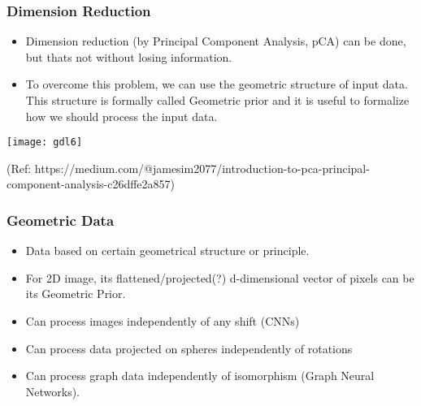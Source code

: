 \begin{frame}[fragile]\frametitle{Dimension Reduction}

\begin{itemize}
\item Dimension reduction (by Principal Component Analysis, pCA) can be done, but thats not without losing information.
\item To overcome this problem, we can use the geometric structure of input data. This structure is formally called Geometric prior and it is useful to formalize how we should process the input data.
\end{itemize}
	  
\begin{center}
\texttt{[image: gdl6]}
\end{center}

{\tiny (Ref: https://medium.com/@jamesim2077/introduction-to-pca-principal-component-analysis-c26dffe2a857)}		
\end{frame}




\begin{frame}[fragile]\frametitle{Geometric Data}

\begin{itemize}
\item Data based on certain geometrical structure or principle. 
\item For 2D image, its flattened/projected(?) d-dimensional vector of pixels can be its Geometric Prior.
\item Can process images independently of any shift (CNNs)
\item Can process data projected on spheres independently of rotations
\item Can process graph data independently of isomorphism (Graph Neural Networks).
\end{itemize}
	
\end{frame}

